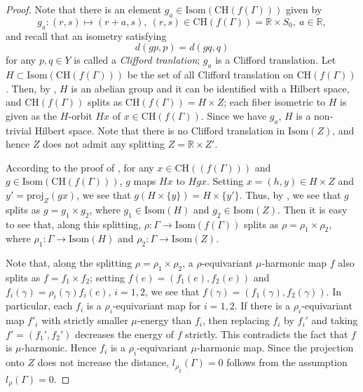 \documentclass[12pt]{amsart}
\numberwithin{equation}{section}
\theoremstyle{plain}
\theoremstyle{definition}
\theoremstyle{remark}
\newcommand{\R}{{\mathbb R}}
\newcommand{\nrprj}{\mathrm{proj}}
\newcommand{\isom}[1]{\mathrm{Isom}({#1})}
\newcommand{\ch}[1]{\mathrm{CH}(#1)}
\begin{document}
\begin{proof}
Note that there is an element $g_a \in \isom{\ch{f(\Gamma)}}$ given by
\begin{equation*}
 g_a \colon (r,s)\mapsto (r+a,s), 
 \ (r,s) \in \ch{f(\Gamma)}=\R \times S_0, \ a \in \R, 
\end{equation*}
and recall that an isometry satisfying
\begin{equation*}
 d(g p, p)=d(g q,q)
\end{equation*}
 for any $p,q \in Y$ is called a {\it Clifford tranlation}; $g_a$ is a
 Clifford translation. 
 Let $H \subset \isom{\ch{f(\Gamma)}}$ be the set of all Clifford
 translation on $\ch{f(\Gamma)}$. 
 Then, by 
 \cite[p.~235 6.15 Theorem (3), (4), (5), (6)]{bridson-haefliger}, 
 $H$ is an abelian group and it can be identified with a Hilbert space,
 and $\ch{f(\Gamma)}$ splits as $\ch{f(\Gamma)}=H\times Z$; 
 each fiber isometric to $H$ is given as the $H$-orbit $Hx$ of 
 $x \in \ch{f(\Gamma)}$. 
 Since we have $g_a$, $H$ is a non-trivial Hilbert space.  
 Note that there is no Clifford translation in $\isom{Z}$, and hence $Z$
 does not admit any splitting $Z=\R \times Z'$.

 According to the proof of 
 \cite[p.~235, 6.15 Theorem (6)]{bridson-haefliger}, 
 for any $x \in \ch{(f(\Gamma))}$ and $g \in \isom{\ch{f(\Gamma)}}$,
 $g$ maps $Hx$ to $Hgx$. 
 Setting $x=(h,y) \in H \times Z$ and $y'=\nrprj_Z(gx)$,  we see that
 $g (H\times \{y\}) = H\times \{y'\}$. 
 Thus, by \cite[p.~56, 5.3 Proposition (4)]{bridson-haefliger},
 we see that $g$ splits as $g=g_1\times g_2$, where
 $g_1 \in \isom{H}$ and $g_2 \in \isom{Z}$. 
 Then it is easy to see that, along this splitting, 
 $\rho \colon \Gamma \rightarrow \isom{f(\Gamma)}$ splits
 as $\rho=\rho_1 \times \rho_2$, where
 $\rho_1 \colon \Gamma \rightarrow \isom{H}$ and 
 $\rho_2 \colon \Gamma \rightarrow \isom{Z}$. 

Note that, along the splitting $\rho=\rho_1\times \rho_2$, a
$\rho$-equivariant $\mu$-harmonic map $f$ also splits as
$f=f_1\times f_2$; setting $f(e)=(f_1(e), f_2(e))$ and 
$f_i(\gamma)=\rho_i(\gamma)f_i(e)$, $i=1,2$, we see that
$f(\gamma)=(f_1(\gamma),f_2(\gamma))$. 
In particular, each $f_i$
is a $\rho_i$-equivariant map for $i=1,2$. 
If there is a $\rho_i$-equivariant map $f'_i$ with strictly smaller
$\mu$-energy than $f_i$, then replacing $f_i$ by $f_i'$ and taking 
$f'=(f_1', f_2')$ decreases the energy of $f$ strictly.  
This contradicts the fact that $f$ is $\mu$-harmonic.
Hence $f_i$ is a $\rho_i$-equivariant $\mu$-harmonic map. 
Since the projection onto $Z$ does not increase the distance, 
$l_{\rho_2}(\Gamma)=0$ follows from the assumption
 $l_{\rho}(\Gamma)=0$.
\end{proof}
\end{document}
